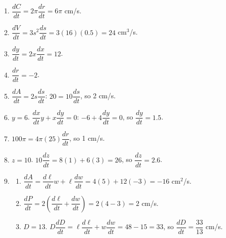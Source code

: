\documentclass[11pt]{article}
\begin{document}
\newpage
\begin{solbox}
\begin{enumerate}[leftmargin=*,itemsep=4pt]
  \item $\dfrac{dC}{dt}=2\pi\dfrac{dr}{dt}=6\pi$ cm/s.
  \item $\dfrac{dV}{dt}=3s^2\dfrac{ds}{dt}=3(16)(0.5)=24$ cm$^3$/s.
  \item $\dfrac{dy}{dt}=2x\dfrac{dx}{dt}=12$.
  \item $\dfrac{dr}{dt}=-2$.
  \item $\dfrac{dA}{dt}=2s\dfrac{ds}{dt}$: $20=10\dfrac{ds}{dt}$, so 2 cm/s.
  \item $y=6$. $\dfrac{dx}{dt}y+x\dfrac{dy}{dt}=0$: $-6+4\dfrac{dy}{dt}=0$, so $\dfrac{dy}{dt}=1.5$.
  \item $100\pi=4\pi(25)\dfrac{dr}{dt}$, so 1 cm/s.
  \item $z=10$. $10\dfrac{dz}{dt}=8(1)+6(3)=26$, so $\dfrac{dz}{dt}=2.6$.
  \item \begin{enumerate}[label=(\alph*),leftmargin=*,itemsep=3pt]
    \item $\dfrac{dA}{dt}=\dfrac{d\ell}{dt}w+\ell\dfrac{dw}{dt}=4(5)+12(-3)=-16$ cm$^2$/s.
    \item $\dfrac{dP}{dt}=2\left(\dfrac{d\ell}{dt}+\dfrac{dw}{dt}\right)=2(4-3)=2$ cm/s.
    \item $D=13$. $D\dfrac{dD}{dt}=\ell\dfrac{d\ell}{dt}+w\dfrac{dw}{dt}=48-15=33$, so $\dfrac{dD}{dt}=\dfrac{33}{13}$ cm/s.
  \end{enumerate}
\end{enumerate}
\end{solbox}
\end{document}
